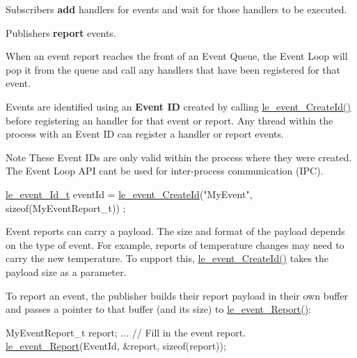 Subscribers {\bfseries add} handlers for events and wait for those handlers to be executed.

Publishers {\bfseries report} events.

When an event report reaches the front of an Event Queue, the Event Loop will pop it from the queue and call any handlers that have been registered for that event.

Events are identified using an {\bfseries  Event I\+D } created by calling {\ttfamily \hyperlink{le__event_loop_8h_a41a96eb3affb07184b519164cf54e213}{le\+\_\+event\+\_\+\+Create\+Id()}} before registering an handler for that event or report. Any thread within the process with an Event I\+D can register a handler or report events.

\begin{DoxyNote}{Note}
These Event I\+Ds are only valid within the process where they were created. The Event Loop A\+P\+I can\textquotesingle{}t be used for inter-\/process communication (I\+P\+C).
\end{DoxyNote}

\begin{DoxyCode}
\hyperlink{le__event_loop_8h_ae6e351b38bc95954f159d16d19d2d55c}{le\_event\_Id\_t} eventId = \hyperlink{le__event_loop_8h_a41a96eb3affb07184b519164cf54e213}{le\_event\_CreateId}(\textcolor{stringliteral}{"MyEvent"}, \textcolor{keyword}{sizeof}(MyEventReport\_t))
      ;
\end{DoxyCode}


Event reports can carry a payload. The size and format of the payload depends on the type of event. For example, reports of temperature changes may need to carry the new temperature. To support this, {\ttfamily \hyperlink{le__event_loop_8h_a41a96eb3affb07184b519164cf54e213}{le\+\_\+event\+\_\+\+Create\+Id()}} takes the payload size as a parameter.

To report an event, the publisher builds their report payload in their own buffer and passes a pointer to that buffer (and its size) to {\ttfamily \hyperlink{le__event_loop_8h_ae3ffe6990b70fb572b4eef06739b4f54}{le\+\_\+event\+\_\+\+Report()}}\+:


\begin{DoxyCode}
MyEventReport\_t report;
...     \textcolor{comment}{// Fill in the event report.}
\hyperlink{le__event_loop_8h_ae3ffe6990b70fb572b4eef06739b4f54}{le\_event\_Report}(EventId, &report, \textcolor{keyword}{sizeof}(report));
\end{DoxyCode}


